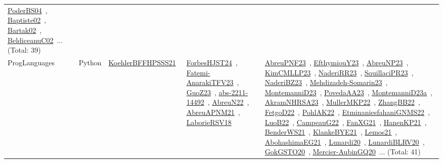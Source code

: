 {\begin{longtable}{lp{3cm}>{\raggedright\arraybackslash}p{6cm}>{\raggedright\arraybackslash}p{6cm}>{\raggedright\arraybackslash}p{8cm}}
\href{../works/PoderBS04.pdf}{PoderBS04}~\cite{PoderBS04}, \href{../works/Baptiste02.pdf}{Baptiste02}~\cite{Baptiste02}, \href{../works/Bartak02.pdf}{Bartak02}~\cite{Bartak02}, \href{../works/BeldiceanuC02.pdf}{BeldiceanuC02}~\cite{BeldiceanuC02}... (Total: 39)\\
ProgLanguages & Python & \href{../works/KoehlerBFFHPSSS21.pdf}{KoehlerBFFHPSSS21}~\cite{KoehlerBFFHPSSS21} & \href{../works/ForbesHJST24.pdf}{ForbesHJST24}~\cite{ForbesHJST24}, \href{../works/Fatemi-AnarakiTFV23.pdf}{Fatemi-AnarakiTFV23}~\cite{Fatemi-AnarakiTFV23}, \href{../works/GuoZ23.pdf}{GuoZ23}~\cite{GuoZ23}, \href{../works/abs-2211-14492.pdf}{abs-2211-14492}~\cite{abs-2211-14492}, \href{../works/AbreuN22.pdf}{AbreuN22}~\cite{AbreuN22}, \href{../works/AbreuAPNM21.pdf}{AbreuAPNM21}~\cite{AbreuAPNM21}, \href{../works/LaborieRSV18.pdf}{LaborieRSV18}~\cite{LaborieRSV18} & \href{../works/AbreuPNF23.pdf}{AbreuPNF23}~\cite{AbreuPNF23}, \href{../works/EfthymiouY23.pdf}{EfthymiouY23}~\cite{EfthymiouY23}, \href{../works/AbreuNP23.pdf}{AbreuNP23}~\cite{AbreuNP23}, \href{../works/KimCMLLP23.pdf}{KimCMLLP23}~\cite{KimCMLLP23}, \href{../works/NaderiRR23.pdf}{NaderiRR23}~\cite{NaderiRR23}, \href{../works/SquillaciPR23.pdf}{SquillaciPR23}~\cite{SquillaciPR23}, \href{../works/NaderiBZ23.pdf}{NaderiBZ23}~\cite{NaderiBZ23}, \href{../works/Mehdizadeh-Somarin23.pdf}{Mehdizadeh-Somarin23}~\cite{Mehdizadeh-Somarin23}, \href{../works/MontemanniD23.pdf}{MontemanniD23}~\cite{MontemanniD23}, \href{../works/PovedaAA23.pdf}{PovedaAA23}~\cite{PovedaAA23}, \href{../works/MontemanniD23a.pdf}{MontemanniD23a}~\cite{MontemanniD23a}, \href{../works/AkramNHRSA23.pdf}{AkramNHRSA23}~\cite{AkramNHRSA23}, \href{../works/MullerMKP22.pdf}{MullerMKP22}~\cite{MullerMKP22}, \href{../works/ZhangBB22.pdf}{ZhangBB22}~\cite{ZhangBB22}, \href{../works/FetgoD22.pdf}{FetgoD22}~\cite{FetgoD22}, \href{../works/PohlAK22.pdf}{PohlAK22}~\cite{PohlAK22}, \href{../works/EtminaniesfahaniGNMS22.pdf}{EtminaniesfahaniGNMS22}~\cite{EtminaniesfahaniGNMS22}, \href{../works/LuoB22.pdf}{LuoB22}~\cite{LuoB22}, \href{../works/CampeauG22.pdf}{CampeauG22}~\cite{CampeauG22}, \href{../works/FanXG21.pdf}{FanXG21}~\cite{FanXG21}, \href{../works/HanenKP21.pdf}{HanenKP21}~\cite{HanenKP21}, \href{../works/BenderWS21.pdf}{BenderWS21}~\cite{BenderWS21}, \href{../works/KlankeBYE21.pdf}{KlankeBYE21}~\cite{KlankeBYE21}, \href{../works/Lemos21.pdf}{Lemos21}~\cite{Lemos21}, \href{../works/AbohashimaEG21.pdf}{AbohashimaEG21}~\cite{AbohashimaEG21}, \href{../works/Lunardi20.pdf}{Lunardi20}~\cite{Lunardi20}, \href{../works/LunardiBLRV20.pdf}{LunardiBLRV20}~\cite{LunardiBLRV20}, \href{../works/GokGSTO20.pdf}{GokGSTO20}~\cite{GokGSTO20}, \href{../works/Mercier-AubinGQ20.pdf}{Mercier-AubinGQ20}~\cite{Mercier-AubinGQ20}... (Total: 41)\\
\end{longtable}
}

